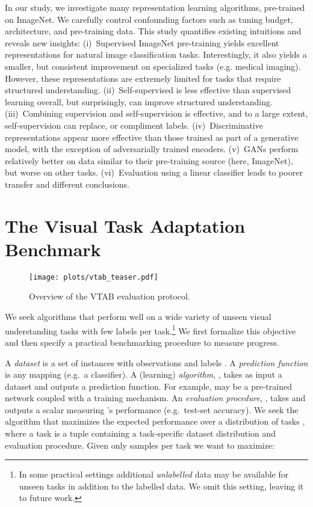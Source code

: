 \documentclass{article}
\newcommand{\imagenet}{ImageNet}
\begin{document}
In our study, we investigate many representation learning algorithms, pre-trained on \imagenet{}.
We carefully control confounding factors such as tuning budget, architecture, and pre-training data.
This study quantifies existing intuitions and reveals new insights:
(i)~Supervised \imagenet{} pre-training yields excellent representations for natural image classification tasks.
Interestingly, it also yields a smaller, but consistent improvement on specialized tasks (e.g. medical imaging).
However, these representations are extremely limited for tasks that require structured understanding.
(ii)~Self-supervised is less effective than supervised learning overall, but surprisingly, can improve structured understanding.
(iii)~Combining supervision and self-supervision is effective, and to a large extent, self-supervision can replace, or compliment labels.
(iv)~Discriminative representations appear more effective than those trained as part of a generative model, with the exception of adversarially trained encoders.
(v)~GANs perform relatively better on data similar to their pre-training source (here, \imagenet{}), but worse on other tasks.
(vi)~Evaluation using a linear classifier leads to poorer transfer and different conclusions.



\section{The Visual Task Adaptation Benchmark}

\begin{figure}[h]
\centering
\texttt{[image: plots/vtab\_teaser.pdf]}
\caption{Overview of the VTAB evaluation protocol.}
\label{fig:vtab_protocol}
\end{figure}

We seek algorithms that perform well on a wide variety of unseen visual understanding tasks with few labels per task.\footnote{
In some practical settings additional \emph{unlabelled} data may be available for unseen tasks in addition to the labelled data.
We omit this setting, leaving it to future work.}
We first formalize this objective and then specify a practical benchmarking procedure to measure progress.

A \emph{dataset}  is a set of  instances  with observations   and labels .
A \emph{prediction function} is any mapping  (e.g.\ a classifier).
A (learning) \emph{algorithm}, , takes as input a dataset and outputs a prediction function.
For example,  may be a pre-trained network coupled with a training mechanism.
An \emph{evaluation procedure}, , takes  and outputs a scalar measuring 's performance (e.g.\ test-set accuracy). 
We seek the algorithm that maximizes the expected performance over a distribution of tasks , where a task  is a tuple containing a task-specific dataset distribution  and evaluation procedure.
Given only  samples per task we want to maximize:
\end{document}
